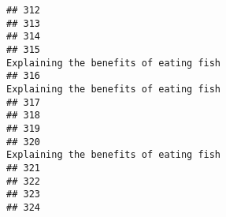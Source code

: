 \documentclass[
]{article}
\begin{document}
\begin{verbatim}
## 312                                                                                                                                                                                                             
## 313                                                                                                                                                                                                             
## 314                                                                                                                                                                                                             
## 315                                                                                                                                                                       Explaining the benefits of eating fish
## 316                                                                                                                                                                       Explaining the benefits of eating fish
## 317                                                                                                                                                                                                             
## 318                                                                                                                                                                                                             
## 319                                                                                                                                                                                                             
## 320                                                                                                                                                                       Explaining the benefits of eating fish
## 321                                                                                                                                                                                                             
## 322                                                                                                                                                                                                             
## 323                                                                                                                                                                                                             
## 324                                                                                                                                                                                                             

\end{verbatim}
\end{document}
